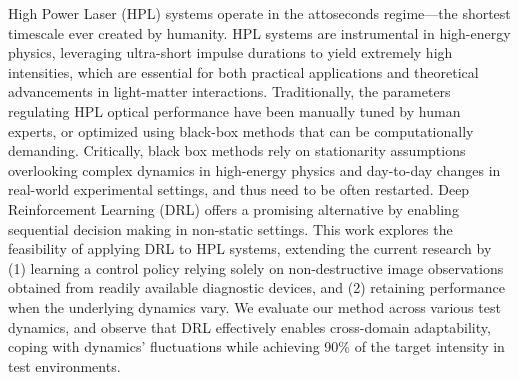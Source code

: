 High Power Laser (HPL) systems operate in the attoseconds regime---the shortest timescale ever created by humanity.
HPL systems are instrumental in high-energy physics, leveraging ultra-short impulse durations to yield extremely high intensities, which are essential for both practical applications and theoretical advancements in light-matter interactions. 
Traditionally, the parameters regulating HPL optical performance have been manually tuned by human experts, or optimized using black-box methods that can be computationally demanding. 
Critically, black box methods rely on stationarity assumptions overlooking complex dynamics in high-energy physics and day-to-day changes in real-world experimental settings, and thus need to be often restarted. Deep Reinforcement Learning (DRL) offers a promising alternative by enabling sequential decision making in non-static settings. 
This work explores the feasibility of applying DRL to HPL systems, extending the current research by (1) learning a control policy relying solely on non-destructive image observations obtained from readily available diagnostic devices, and (2) retaining performance when the underlying dynamics vary.
We evaluate our method across various test dynamics, and observe that DRL effectively enables cross-domain adaptability, coping with dynamics' fluctuations while achieving 90\% of the target intensity in test environments.